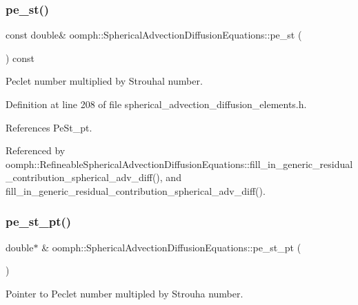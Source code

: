 \subsubsection{\texorpdfstring{pe\+\_\+st()}{pe\_st()}}
{\footnotesize\ttfamily const double\& oomph\+::\+Spherical\+Advection\+Diffusion\+Equations\+::pe\+\_\+st (\begin{DoxyParamCaption}{ }\end{DoxyParamCaption}) const\hspace{0.3cm}{\ttfamily [inline]}}



Peclet number multiplied by Strouhal number. 



Definition at line 208 of file spherical\+\_\+advection\+\_\+diffusion\+\_\+elements.\+h.



References Pe\+St\+\_\+pt.



Referenced by oomph\+::\+Refineable\+Spherical\+Advection\+Diffusion\+Equations\+::fill\+\_\+in\+\_\+generic\+\_\+residual\+\_\+contribution\+\_\+spherical\+\_\+adv\+\_\+diff(), and fill\+\_\+in\+\_\+generic\+\_\+residual\+\_\+contribution\+\_\+spherical\+\_\+adv\+\_\+diff().

\mbox{\label{classoomph_1_1SphericalAdvectionDiffusionEquations_ab70b9505075279b1dc935a620407df1f}} 
\subsubsection{\texorpdfstring{pe\+\_\+st\+\_\+pt()}{pe\_st\_pt()}}
{\footnotesize\ttfamily double$\ast$ \& oomph\+::\+Spherical\+Advection\+Diffusion\+Equations\+::pe\+\_\+st\+\_\+pt (\begin{DoxyParamCaption}{ }\end{DoxyParamCaption})\hspace{0.3cm}{\ttfamily [inline]}}



Pointer to Peclet number multipled by Strouha number. 




